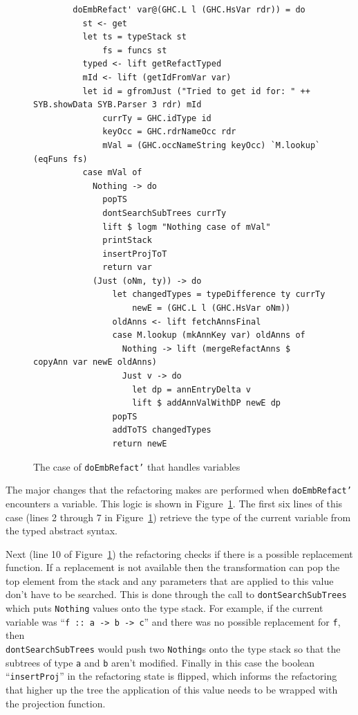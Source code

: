 \begin{figure}[!t]
\begin{lstlisting}
        doEmbRefact' var@(GHC.L l (GHC.HsVar rdr)) = do
          st <- get          
          let ts = typeStack st
              fs = funcs st              
          typed <- lift getRefactTyped
          mId <- lift (getIdFromVar var)
          let id = gfromJust ("Tried to get id for: " ++ SYB.showData SYB.Parser 3 rdr) mId
              currTy = GHC.idType id
              keyOcc = GHC.rdrNameOcc rdr
              mVal = (GHC.occNameString keyOcc) `M.lookup` (eqFuns fs)
          case mVal of
            Nothing -> do
              popTS
              dontSearchSubTrees currTy
              lift $ logm "Nothing case of mVal"
              printStack
              insertProjToT
              return var
            (Just (oNm, ty)) -> do
                let changedTypes = typeDifference ty currTy
                    newE = (GHC.L l (GHC.HsVar oNm))
                oldAnns <- lift fetchAnnsFinal
                case M.lookup (mkAnnKey var) oldAnns of
                  Nothing -> lift (mergeRefactAnns $ copyAnn var newE oldAnns)
                  Just v -> do
                    let dp = annEntryDelta v
                    lift $ addAnnValWithDP newE dp
                popTS
                addToTS changedTypes                
                return newE
\end{lstlisting}
\caption{The case of \texttt{doEmbRefact'} that handles variables}
\label{embRefactVar}
\end{figure}

The major changes that the refactoring makes are performed when \texttt{doEmbRefact'} encounters a variable. This logic is shown in Figure~\ref{embRefactVar}. The first six lines of this case (lines 2 through 7 in Figure~\ref{embRefactVar}) retrieve the type of the current variable from the typed abstract syntax. 

Next (line 10 of Figure~\ref{embRefactVar}) the refactoring checks if there is a possible replacement function. If a replacement is not available then the transformation can pop the top element from the stack and any parameters that are applied to this value don't have to be searched. This is done through the call to \texttt{dontSearchSubTrees} which puts \texttt{Nothing} values onto the type stack. For example, if the current variable was ``\texttt{f :: a -> b -> c}'' and there was no possible replacement for \texttt{f}, then \\ \texttt{dontSearchSubTrees} would push two \texttt{Nothing}s onto the type stack so that the subtrees of type \texttt{a} and \texttt{b} aren't modified. Finally in this case the boolean ``\texttt{insertProj}'' in the refactoring state is flipped, which informs the refactoring that higher up the tree the application of this value needs to be wrapped with the projection function. 

